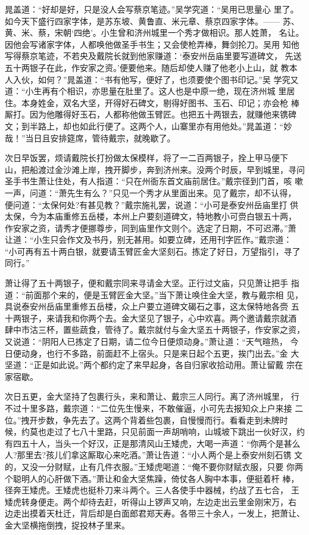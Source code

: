 晁盖道：“好却是好，只是没人会写蔡京笔迹。”吴学究道：“吴用已思量心
里了。如今天下盛行四家字体，是苏东坡、黄鲁直、米元章、蔡京四家字体。——
苏、黄、米、蔡，宋朝‘四绝’。小生曾和济州城里一个秀才做相识。那人姓萧，
名让。因他会写诸家字体，人都唤他做圣手书生；又会使枪弄棒，舞剑抡刀。吴用
知他写得蔡京笔迹，不若央及戴院长就到他家赚道：‘泰安州岳庙里要写道碑文，
先送五十两银子在此，作安家之资。’便要他来。随后却使人赚了他老小上山，就
教本人入伙，如何？”晁盖道：“书有他写，便好了，也须要使个图书印记。”吴
学究又道：“小生再有个相识，亦思量在肚里了。这人也是中原一绝，现在济州城
里居住。本身姓金，双名大坚，开得好石碑文，剔得好图书、玉石、印记；亦会枪
棒厮打。因为他雕得好玉石，人都称他做玉臂匠。也把五十两银去，就赚他来镌碑
文；到半路上，却也如此行便了。这两个人，山寨里亦有用他处。”晁盖道：“妙
哉！”当日且安排筵席，管待戴宗，就晚歇了。

次日早饭罢，烦请戴院长打扮做太保模样，将了一二百两银子，拴上甲马便下
山，把船渡过金沙滩上岸，拽开脚步，奔到济州来。没两个时辰，早到城里，寻问
圣手书生萧让住处，有人指道：“只在州衙东首文庙前居住。”戴宗径到门首，咳
嗽一声，问道：“萧先生有么？”只见一个秀才从里面出来。见了戴宗，却不认得，
便问道：“太保何处?有甚见教？”戴宗施礼罢，说道：“小可是泰安州岳庙里打
供太保，今为本庙重修五岳楼，本州上户要刻道碑文，特地教小可赍白银五十两，
作安家之资，请秀才便挪尊步，同到庙里作文则个。选定了日期，不可迟滞。”萧
让道：“小生只会作文及书丹，别无甚用。如要立碑，还用刊字匠作。”戴宗道：
“小可再有五十两白银，就要请玉臂匠金大坚刻石。拣定了好日，万望指引，寻了
同行。”

萧让得了五十两银子，便和戴宗同来寻请金大坚。正行过文庙，只见萧让把手
指道：“前面那个来的，便是玉臂匠金大坚。”当下萧让唤住金大坚，教与戴宗相
见，具说泰安州岳庙里重修五岳楼，众上户要立道碑文碣石之事，这太保特地各赍
五十两银子，来请我和你两个去。金大坚见了银子，心中欢喜。两个邀请戴宗就酒
肆中市沽三杯，置些蔬食，管待了。戴宗就付与金大坚五十两银子，作安家之资，
又说道：“阴阳人已拣定了日期，请二位今日便烦动身。”萧让道：“天气暄热，
今日便动身，也行不多路，前面赶不上宿头。只是来日起个五更，挨门出去。”金
大坚道：“正是如此说。”两个都约定了来早起身，各自归家收拾动用。萧让留戴
宗在家宿歇。

次日五更，金大坚持了包裹行头，来和萧让、戴宗三人同行。离了济州城里，
行不过十里多路，戴宗道：“二位先生慢来，不敢催逼，小可先去报知众上户来接
二位。”拽开步数，争先去了。这两个背着些包裹，自慢慢而行。看看走到未牌时
候，约莫也走过了七八十里路，只见前面一声胡哨响，山城坡下跳出一伙好汉，约
有四五十人，当头一个好汉，正是那清风山王矮虎，大喝一声道：“你两个是甚么
人?那里去?孩儿们拿这厮取心来吃酒。”萧让告道：“小人两个是上泰安州刻石镌
文的，又没一分财赋，止有几件衣服。”王矮虎喝道：“俺不要你财赋衣服，只要
你两个聪明人的心肝做下酒。”萧让和金大坚焦躁，倚仗各人胸中本事，便挺着杆
棒，径奔王矮虎。王矮虎也挺朴刀来斗两个。三人各使手中器械，约战了五七合，
王矮虎转身便走。两个却待去赶，听得山上锣声又响，左边走出云里金刚宋万，右
边走出摸着天杜迁，背后却是白面郎君郑天寿。各带三十余人，一发上，把萧让、
金大坚横拖倒拽，捉投林子里来。

